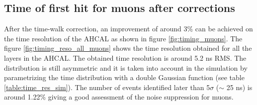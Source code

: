 \subsection{Time of first hit for muons after corrections}
\label{subsec:Muon_final}

After the time-walk correction, an improvement of around 3\% can be achieved on the time resolution of the AHCAL as shown in figure \ref{fig:timing_muons}. The figure \ref{fig:timing_reso_all_muons} shows the time resolution obtained for all the layers in the AHCAL. The obtained time resolution is around 5.2 ns RMS. The distribution is still asymmetric and it is taken into account in the simulation by parametrizing the time distribution with a double Gaussian function (see table \ref{table:time_res_sim}). The number of events identified later than 5$\sigma$ ($\sim$ 25 ns) is around 1.22\% giving a good assessment of the noise suppression for muons.

